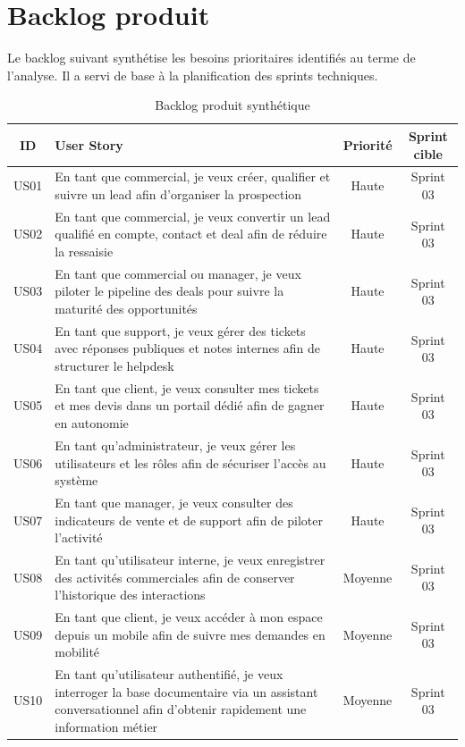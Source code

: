 \section{Backlog produit}
Le backlog suivant synthétise les besoins prioritaires identifiés au terme de l'analyse. Il a servi de base à la planification des sprints techniques.

\begin{table}[H]
\centering
\footnotesize
\caption{Backlog produit synthétique}
\label{tab:backlog}
\begin{tabularx}{\textwidth}{|c|X|c|c|}
\hline
\textbf{ID} & \textbf{User Story} & \textbf{Priorité} & \textbf{Sprint cible} \\
\hline
US01 & En tant que commercial, je veux créer, qualifier et suivre un lead afin d'organiser la prospection & Haute & Sprint 03 \\
\hline
US02 & En tant que commercial, je veux convertir un lead qualifié en compte, contact et deal afin de réduire la ressaisie & Haute & Sprint 03 \\
\hline
US03 & En tant que commercial ou manager, je veux piloter le pipeline des deals pour suivre la maturité des opportunités & Haute & Sprint 03 \\
\hline
US04 & En tant que support, je veux gérer des tickets avec réponses publiques et notes internes afin de structurer le helpdesk & Haute & Sprint 03 \\
\hline
US05 & En tant que client, je veux consulter mes tickets et mes devis dans un portail dédié afin de gagner en autonomie & Haute & Sprint 03 \\
\hline
US06 & En tant qu'administrateur, je veux gérer les utilisateurs et les rôles afin de sécuriser l'accès au système & Haute & Sprint 03 \\
\hline
US07 & En tant que manager, je veux consulter des indicateurs de vente et de support afin de piloter l'activité & Haute & Sprint 03 \\
\hline
US08 & En tant qu'utilisateur interne, je veux enregistrer des activités commerciales afin de conserver l'historique des interactions & Moyenne & Sprint 03 \\
\hline
US09 & En tant que client, je veux accéder à mon espace depuis un mobile afin de suivre mes demandes en mobilité & Moyenne & Sprint 03 \\
\hline
US10 & En tant qu'utilisateur authentifié, je veux interroger la base documentaire via un assistant conversationnel afin d'obtenir rapidement une information métier & Moyenne & Sprint 03 \\
\hline
\end{tabularx}
\end{table}

